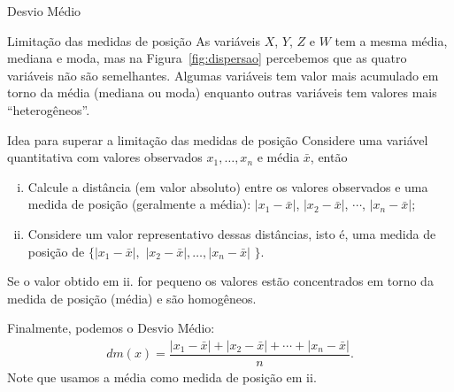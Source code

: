 \documentclass[8pt]{beamer}
\begin{document}
\begin{frame}{Desvio Médio}
\begin{block}{Limitação das medidas de posição}
 As variáveis $X$, $Y$, $Z$ e $W$ tem a mesma média, mediana e moda, mas na Figura~\ref{fig:dispersao} percebemos que as quatro variáveis não são semelhantes. Algumas variáveis tem valor mais acumulado
 em torno da média (mediana ou moda) enquanto outras variáveis tem valores mais ``heterogêneos''.
\end{block}

 \begin{block}{Idea para superar a limitação das medidas de posição}
 Considere uma variável quantitativa com valores observados $x_1, \dots, x_n$ e média $\bar{x}$, então
 \begin{enumerate}[i.]
  \item Calcule a distância (em valor absoluto) entre os valores observados e uma medida de posição (geralmente a média): $\left\vert x_1 - \bar{x} \right\vert$, $\left\vert x_2 - \bar{x} \right\vert$, $\cdots$, $\left\vert x_n - \bar{x} \right\vert$;
  \item Considere um valor representativo dessas distâncias, isto é, uma medida de posição de $\{\left\vert x_1-\bar{x} \right\vert,$ $ \left\vert x_2-\bar{x} \right\vert, \dots, \left\vert x_n-\bar{x} \right\vert$ $\}$.
 \end{enumerate}
 {\color{magenta} Se o valor obtido em ii. for pequeno os valores estão concentrados em torno da medida de posição (média) e são homogêneos. }
 
 Finalmente, podemos o Desvio Médio:
 \begin{align*}
  dm(x) = \dfrac{\left\vert x_1-\bar{x} \right\vert + \left\vert x_2-\bar{x} \right\vert+\cdots+\left\vert x_n-\bar{x} \right\vert}{n}.
 \end{align*}
 Note que usamos a média como medida de posição em ii.
 \end{block} 
\end{frame}
\end{document}
